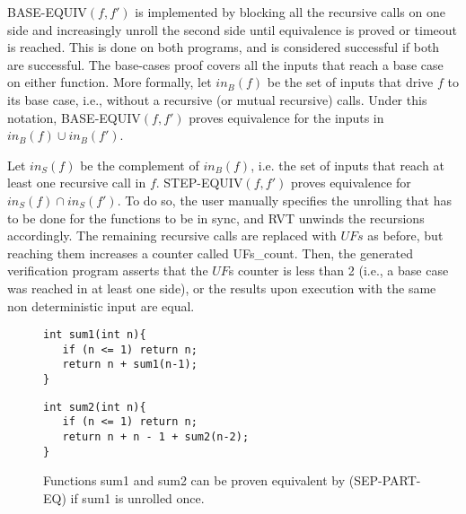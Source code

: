 BASE-EQUIV$(f,f')$ is implemented by blocking all the recursive calls on one side and increasingly unroll the second side until equivalence is proved or timeout is reached. This is done on both programs, and is considered successful if both are successful. The base-cases proof covers all the inputs that reach a base case on either function. More formally, let $in_B(f)$ be the set of inputs that drive $f$ to its base case, i.e., without a recursive (or mutual recursive) calls. Under this notation, BASE-EQUIV$(f,f')$ proves equivalence for the  inputs in $in_B(f) \cup in_B(f')$.

Let $in_S(f)$ be the complement of $in_B(f)$, i.e. the set of inputs that reach at least one recursive call in $f$. STEP-EQUIV$(f,f')$ proves equivalence for $in_S(f) \cap in_S(f')$. To do so, the user manually specifies the unrolling that has to be done for the functions to be in sync, and RVT unwinds the recursions accordingly. The remaining recursive calls are replaced with $UFs$ as before, but reaching them increases a counter called UFs\_count. Then, the generated verification program asserts that the $UF$s counter is less than 2  (i.e., a base case was reached in at least one side), or the results upon execution with the same non deterministic input are equal. 

\begin{figure}[h]
\begin{center}
\begin{minipage}{7 cm}
\begin{lstlisting}
int sum1(int n){
   if (n <= 1) return n;
   return n + sum1(n-1);
}
\end{lstlisting}
\end{minipage}
\begin{minipage}{7 cm}
\begin{lstlisting}
int sum2(int n){
   if (n <= 1) return n;
   return n + n - 1 + sum2(n-2);
}
\end{lstlisting}
\end{minipage}
\caption{Functions sum1 and sum2 can be proven equivalent by (SEP-PART-EQ) if sum1 is unrolled once.}
\label{fig:sum}
\end{center}
\end{figure}

